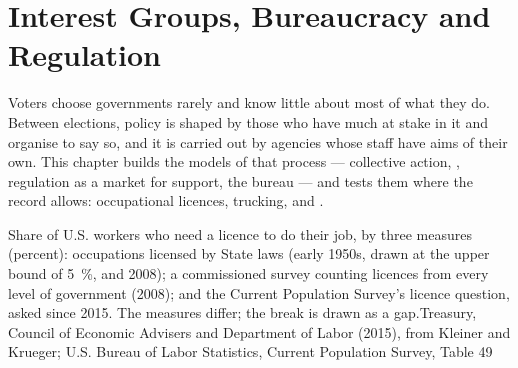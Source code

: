 \chapter{Interest Groups, Bureaucracy and Regulation}\label{ch:b3:interest-groups-and-regulation}

Voters choose governments rarely and know little about most of what they do. Between
elections, policy is shaped by those who have much at stake in it and organise to
say so, and it is carried out by agencies whose staff have aims of their own. This
chapter builds the models of that process --- collective action, ,
regulation as a market for support, the bureau --- and tests them where the record
allows: occupational licences, trucking,  and .

\begin{openingchart}{Share of U.S. workers who need a licence to do their job, by three
measures (percent): occupations licensed by State laws (early 1950s, drawn at the
upper bound of 5~\%, and 2008); a commissioned survey counting licences from every
level of government (2008); and the Current Population Survey's licence question,
asked since 2015. The measures differ; the break is drawn as a gap.}{Treasury, Council
of Economic Advisers and Department of Labor (2015), from Kleiner and Krueger; U.S.
Bureau of Labor Statistics, Current Population Survey, Table 49}
\end{openingchart}

